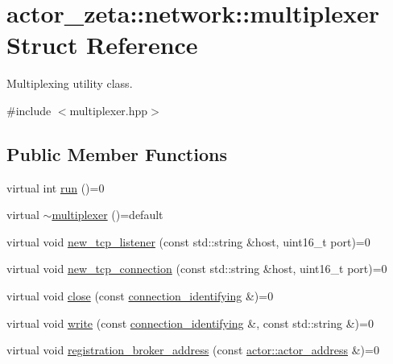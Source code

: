 \hypertarget{structactor__zeta_1_1network_1_1multiplexer}{}\section{actor\+\_\+zeta\+:\+:network\+:\+:multiplexer Struct Reference}
\label{structactor__zeta_1_1network_1_1multiplexer}


Multiplexing utility class.  




{\ttfamily \#include $<$multiplexer.\+hpp$>$}

\subsection*{Public Member Functions}
\begin{DoxyCompactItemize}
\item 
virtual int \hyperlink{structactor__zeta_1_1network_1_1multiplexer_a5147eb14922a4023242b3d37d689cd74}{run} ()=0
\item 
virtual \hyperlink{structactor__zeta_1_1network_1_1multiplexer_a1dd1d5a78b60a3b33fcb54a6228da2d7}{$\sim$multiplexer} ()=default
\item 
virtual void \hyperlink{structactor__zeta_1_1network_1_1multiplexer_aa01fa4cd80644ed363e5eafa054af12d}{new\+\_\+tcp\+\_\+listener} (const std\+::string \&host, uint16\+\_\+t port)=0
\item 
virtual void \hyperlink{structactor__zeta_1_1network_1_1multiplexer_aaec037d10b2233714cb03b2b3925a4e6}{new\+\_\+tcp\+\_\+connection} (const std\+::string \&host, uint16\+\_\+t port)=0
\item 
virtual void \hyperlink{structactor__zeta_1_1network_1_1multiplexer_a083a55987b89b74917babec426e886b6}{close} (const \hyperlink{classactor__zeta_1_1network_1_1connection__identifying}{connection\+\_\+identifying} \&)=0
\item 
virtual void \hyperlink{structactor__zeta_1_1network_1_1multiplexer_afc9b254fa12ef53119889c5002714f36}{write} (const \hyperlink{classactor__zeta_1_1network_1_1connection__identifying}{connection\+\_\+identifying} \&, const std\+::string \&)=0
\item 
virtual void \hyperlink{structactor__zeta_1_1network_1_1multiplexer_a3f750bb1b6aaea28af84f4a40c1953ce}{registration\+\_\+broker\+\_\+address} (const \hyperlink{classactor__zeta_1_1actor_1_1actor__address}{actor\+::actor\+\_\+address} \&)=0
\end{DoxyCompactItemize}


